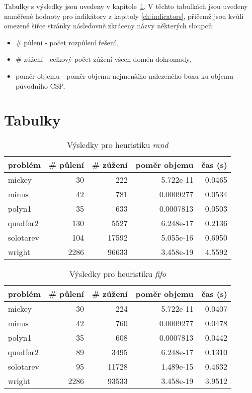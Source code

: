 {Tabulky s výsledky jsou uvedeny v kapitole~\ref{ch:resultTables}. V těchto tabulkách jsou uvedeny naměřené hodnoty pro indikátory z kapitoly \ref{ch:indicators}, přičemž jsou kvůli omezené šířce stránky následovně zkráceny názvy některých sloupců:


\begin{itemize}
    \item \# půlení - počet rozpůlení řešení,
    \item \# zúžení - celkový počet zúžení všech domén dohromady,
    \item poměr objemu - poměr objemu nejmenšího nalezeného boxu ku objemu původního CSP.
\end{itemize}


\section{Tabulky}
\label{ch:resultTables}

\begin{table}[H]
\centering
\begin{tabular}{lrrrr}
\hline
problém & \# půlení & \# zúžení & poměr objemu & čas (s) \\ \hline
mickey & 30 & 222 & 5.722e-11 & 0.0465 \\
minus & 42 & 781 & 0.0009277 & 0.0534 \\
polyn1 & 35 & 633 & 0.0007813 & 0.0503 \\
quadfor2 & 130 & 5527 & 6.248e-17 & 0.2136 \\
solotarev & 104 & 17592 & 5.055e-16 & 0.6950 \\
wright & 2286 & 96633 & 3.458e-19 & 4.5592 \\
\end{tabular}
\caption{Výsledky pro heuristiku \emph{rand}}
\label{rand}
\end{table}



\begin{table}[H]
\centering
\begin{tabular}{lrrrr}
\hline
problém & \# půlení & \# zúžení & poměr objemu & čas (s) \\ \hline
mickey & 30 & 224 & 5.722e-11 & 0.0407 \\
minus & 42 & 760 & 0.0009277 & 0.0478 \\
polyn1 & 35 & 608 & 0.0007813 & 0.0442 \\
quadfor2 & 89 & 3495 & 6.248e-17 & 0.1310 \\
solotarev & 95 & 11728 & 1.489e-15 & 0.4632 \\
wright & 2286 & 93533 & 3.458e-19 & 3.9512 \\
\end{tabular}
\caption{Výsledky pro heuristiku \emph{fifo}}
\label{fifo}
\end{table}



}
